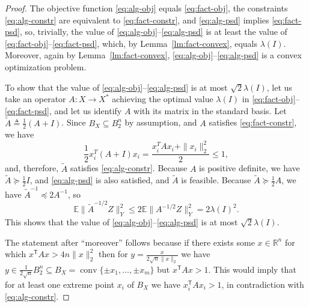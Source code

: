 \documentclass[11pt]{article}
\newcommand{\R}{{\mathbb{R}}}
\newcommand{\E}{\mathbb{E}}
\newcommand{\T}{\mathsf T}
\newcommand{\eqdef}{\triangleq}
\DeclareMathOperator{\conv}{conv}
\begin{document}
\begin{proof}
  The objective function \eqref{eq:alg-obj} equals
  \eqref{eq:fact-obj}, the constraints \eqref{eq:alg-constr} are
  equivalent to \eqref{eq:fact-constr}, and \eqref{eq:alg-psd}
  implies \eqref{eq:fact-psd}, so, trivially, the value of
  \eqref{eq:alg-obj}--\eqref{eq:alg-psd} is at least the value of
  \eqref{eq:fact-obj}--\eqref{eq:fact-psd}, which, by
  Lemma~\ref{lm:fact-convex}, equals $\lambda(I)$. Moreover, again by
  Lemma~\ref{lm:fact-convex}, \eqref{eq:alg-obj}--\eqref{eq:alg-psd}
  is a convex optimization problem. 
  
  To show that the value of \eqref{eq:alg-obj}--\eqref{eq:alg-psd} is
  at most $\sqrt{2}\lambda(I)$, let us take an operator $A:X\to X^*$
  achieving the optimal value $\lambda(I)$ in
  \eqref{eq:fact-obj}--\eqref{eq:fact-psd}, and let us identify $A$
  with its matrix in the standard basis. Let $\tilde{A} \eqdef
  \frac12(A + I)$. Since $B_X \subseteq B_2^n$ by assumption, and $A$
  satisfies \eqref{eq:fact-constr}, we have
  \[
  \frac12 x_i^T (A + I) x_i = \frac{x_i^T A x_i + \|x_i \|_2^2 }{2} 
  \le 1,
  \]
  and, therefore, $\tilde{A}$ satisfies \eqref{eq:alg-constr}. Because
  $A$ is positive definite, we have $\tilde{A} \succeq \frac12 I$, and
  \eqref{eq:alg-psd} is also satisfied, and $\tilde{A}$ is feasible. Because
  $\tilde{A} \succeq \frac12 A$, we have $\tilde{A}^{-1} \preceq
  2A^{-1}$, so
  \[
  \E\|\tilde{A}^{-1/2} Z\|^2_Y \le 2 \E\|A^{-1/2} Z\|^2_Y =
  2\lambda(I)^2.
  \]
  This shows that the value of
  \eqref{eq:alg-obj}--\eqref{eq:alg-psd} is at most
  $\sqrt{2}\lambda(I)$. 

  The statement after ``moreover'' follows because if there exists
  some $x \in \R^n$ for which $x^\T A x > 4n \|x\|_2^2$ then for $y =
  \frac{x}{2\sqrt{n}\|x\|_2}$ we have $y \in \frac{1}{2\sqrt{n}}B_2^n
  \subseteq B_X = \conv\{\pm x_1,
  \ldots, \pm x_m\}$ but $x^\T A x > 1$. This would imply that for at
  least one extreme point $x_i$ of $B_X$ we have $x_i^\T A x_i > 1$, in
  contradiction with \eqref{eq:alg-constr}. 
\end{proof}
\end{document}
